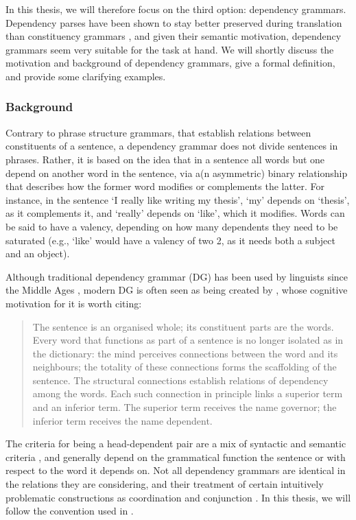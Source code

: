 \documentclass{report}
\theoremstyle{break}
\begin{document}
In this thesis, we will therefore focus on the third option: dependency grammars. Dependency parses have been shown to stay better preserved during translation than constituency grammars \citep{fox2002phrasal}, and given their semantic motivation, dependency grammars seem very suitable for the task at hand. We will shortly discuss the motivation and background of dependency grammars, give a formal definition, and provide some clarifying examples.

\subsubsection{Background}

Contrary to phrase structure grammars, that establish relations between constituents of a sentence, a dependency grammar does not divide sentences in phrases. Rather, it is based on the idea that in a sentence all words but one depend on another word in the sentence, via a(n asymmetric) binary relationship that describes how the former word modifies or complements the latter. For instance, in the sentence `I really like writing my thesis', `my' depends on `thesis', as it complements it, and `really' depends on `like', which it modifies. Words can be said to have a valency, depending on how many dependents they need to be saturated (e.g., `like' would have a valency of two 2, as it needs both a subject and an object).

Although traditional dependency grammar (DG) has been used by linguists since the Middle Ages \citep{covington1990dependency}, modern DG is often seen as being created by \cite{tesniere1959elements}, whose cognitive motivation for it is worth citing:

\begin{quote}
The sentence is an organised whole; its constituent parts are the words. Every word that functions as part of a sentence is no longer isolated as in the dictionary: the mind perceives connections between the word and its neighbours; the totality of these connections forms the scaffolding of the sentence. The structural connections establish relations of dependency among the words. Each such connection in principle links a superior term and an inferior term. The superior term receives the name governor; the inferior term receives the name dependent. \citep[Translation:][]{ryan2013}
\end{quote}

The criteria for being a head-dependent pair are a mix of syntactic and semantic criteria \citep{nivre2005dependency}, and generally depend on the grammatical function the sentence or with respect to the word it depends on. Not all dependency grammars are identical in the relations they are considering, and their treatment of certain intuitively problematic constructions as coordination and conjunction \citep{nivre2005dependency}. In this thesis, we will follow the convention used in \cite{de2006generating}.
\end{document}
